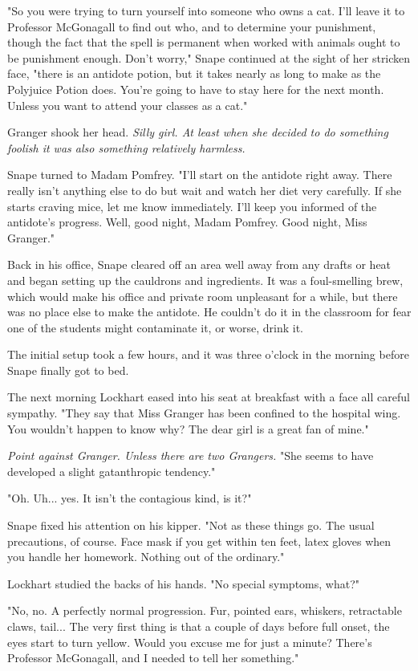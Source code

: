 \documentclass[a4paper,11pt]{article}
\begin{document}
"So you were trying to turn yourself into someone who owns a cat. I'll leave it to Professor McGonagall to find out who, and to determine your punishment, though the fact that the spell is permanent when worked with animals ought to be punishment enough. Don't worry," Snape continued at the sight of her stricken face, "there is an antidote potion, but it takes nearly as long to make as the Polyjuice Potion does. You're going to have to stay here for the next month. Unless you want to attend your classes as a cat."

Granger shook her head. \emph{Silly girl. At least when she decided to do something foolish it was also something relatively harmless.}

Snape turned to Madam Pomfrey. "I'll start on the antidote right away. There really isn't anything else to do but wait and watch her diet very carefully. If she starts craving mice, let me know immediately. I'll keep you informed of the antidote's progress. Well, good night, Madam Pomfrey. Good night, Miss Granger."

Back in his office, Snape cleared off an area well away from any drafts or heat and began setting up the cauldrons and ingredients. It was a foul-smelling brew, which would make his office and private room unpleasant for a while, but there was no place else to make the antidote. He couldn't do it in the classroom for fear one of the students might contaminate it, or worse, drink it.

The initial setup took a few hours, and it was three o'clock in the morning before Snape finally got to bed.

The next morning Lockhart eased into his seat at breakfast with a face all careful sympathy. "They say that Miss Granger has been confined to the hospital wing. You wouldn't happen to know why? The dear girl is a great fan of mine."

\emph{Point against Granger. Unless there are two Grangers.} "She seems to have developed a slight gatanthropic tendency."

"Oh. Uh... yes. It isn't the contagious kind, is it?"

Snape fixed his attention on his kipper. "Not as these things go. The usual precautions, of course. Face mask if you get within ten feet, latex gloves when you handle her homework. Nothing out of the ordinary."

Lockhart studied the backs of his hands. "No special symptoms, what?"

"No, no. A perfectly normal progression. Fur, pointed ears, whiskers, retractable claws, tail... The very first thing is that a couple of days before full onset, the eyes start to turn yellow. Would you excuse me for just a minute? There's Professor McGonagall, and I needed to tell her something."
\end{document}
